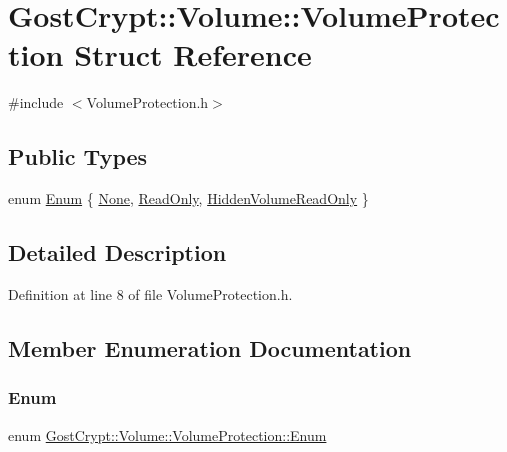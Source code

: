 \hypertarget{struct_gost_crypt_1_1_volume_1_1_volume_protection}{}\section{Gost\+Crypt\+:\+:Volume\+:\+:Volume\+Protection Struct Reference}
\label{struct_gost_crypt_1_1_volume_1_1_volume_protection}


{\ttfamily \#include $<$Volume\+Protection.\+h$>$}

\subsection*{Public Types}
\begin{DoxyCompactItemize}
\item 
enum \hyperlink{struct_gost_crypt_1_1_volume_1_1_volume_protection_a8dd7301af256c893dc1e0a08c7530c7f}{Enum} \{ \hyperlink{struct_gost_crypt_1_1_volume_1_1_volume_protection_a8dd7301af256c893dc1e0a08c7530c7fad00339f60b8f78724ae6b29f82c9ff2b}{None}, 
\hyperlink{struct_gost_crypt_1_1_volume_1_1_volume_protection_a8dd7301af256c893dc1e0a08c7530c7fa98e263c7b209a6fa39f25856c93a4f39}{Read\+Only}, 
\hyperlink{struct_gost_crypt_1_1_volume_1_1_volume_protection_a8dd7301af256c893dc1e0a08c7530c7fafd5e480bb5363317bb8bf06b6b466095}{Hidden\+Volume\+Read\+Only}
 \}
\end{DoxyCompactItemize}


\subsection{Detailed Description}


Definition at line 8 of file Volume\+Protection.\+h.



\subsection{Member Enumeration Documentation}
\mbox{\label{struct_gost_crypt_1_1_volume_1_1_volume_protection_a8dd7301af256c893dc1e0a08c7530c7f}} 
\subsubsection{\texorpdfstring{Enum}{Enum}}
{\footnotesize\ttfamily enum \hyperlink{struct_gost_crypt_1_1_volume_1_1_volume_protection_a8dd7301af256c893dc1e0a08c7530c7f}{Gost\+Crypt\+::\+Volume\+::\+Volume\+Protection\+::\+Enum}}

